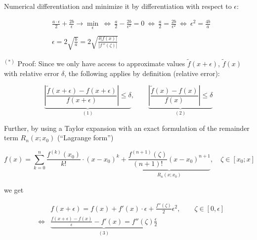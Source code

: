 \begin{vbframe}{Numerical differentiation}
  and minimize it by differentiation with respect to $\epsilon$:
  
  \vspace*{-0.5cm}
  
  \begin{footnotesize}
  \begin{eqnarray*}
  &\frac{a\cdot\epsilon}2 + \frac{2b}\epsilon \rightarrow
  \underset\epsilon {\min} \ \Leftrightarrow \ \frac a2 - \frac
  {2b}{\epsilon^2} = 0 \ \Leftrightarrow \ \frac a2 = \frac
  {2b}{\epsilon^2} \ \Leftrightarrow \ \epsilon^2=\frac{4b}a\\
  \\
  &\epsilon = 2 \sqrt{\frac ba} = 2
  \sqrt{\frac{\delta\left|f(x)\right|}{\left| f\!\,''(\zeta)\right|}}
  \end{eqnarray*}
  \end{footnotesize}
  
  
  \framebreak
  
  \begin{footnotesize}
  
  $^{(*)}$ Proof: Since we only have access to approximate values $\tilde f(x + \epsilon)$, $\tilde f(x)$ with relative error $\delta$, the following applies by definition (relative error):
  
  $$\underbrace{\left|\frac{\tilde f(x + \epsilon) - f(x + \epsilon)}{f(x + \epsilon)}\right| \le \delta}_{(1)},
  \qquad \underbrace{\left|\frac{\tilde f(x) - f(x)}{f(x)}\right| \le \delta}_{(2)}
  $$
  
  Further, by using a Taylor expansion with an exact formulation of the remainder term $R_n(x; x_0)$ (\enquote{Lagrange form}) 
  
  $$
    f(x) = \sum_{k = 0}^n \frac{f^{(k)}(x_0)}{k!} \cdot \left(x - x_0\right)^k + \underbrace{\frac{f^{(n + 1)} (\zeta)}{(n + 1)!} (x - x_0)^{n + 1}}_{R_n(x;x_0)}, \quad \zeta \in [x_0; x]
  $$
  
  we get 
  
  \vspace*{-0.5cm}
  
  \begin{eqnarray*}
    && f(x + \epsilon) = f(x) + f'(x) \cdot \epsilon + \frac{f''(\zeta)}{2} \epsilon^2, \qquad \zeta \in [0, \epsilon] \\
    &\Leftrightarrow& \underbrace{\frac{f(x + \epsilon) - f(x)}{\epsilon} - f'(x) = f''(\zeta) \frac{\epsilon}{2}}_{(3)} 
  \end{eqnarray*}
  
  \framebreak 
  

\end{footnotesize}
\end{vbframe}
